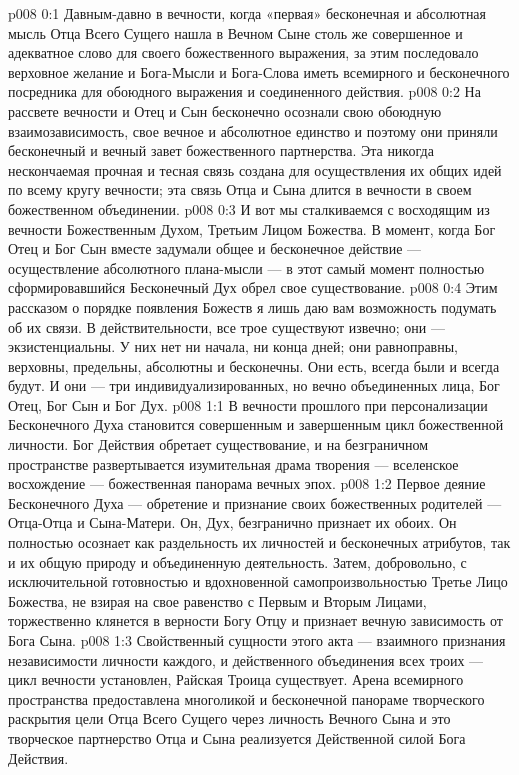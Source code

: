 \author{Божественный Советник}
\vs p008 0:1 Давным\hyp{}давно в вечности, когда «первая» бесконечная и абсолютная мысль Отца Всего Сущего нашла в Вечном Сыне столь же совершенное и адекватное слово для своего божественного выражения, за этим последовало верховное желание и Бога\hyp{}Мысли и Бога\hyp{}Слова иметь всемирного и бесконечного посредника для обоюдного выражения и соединенного действия.
\vs p008 0:2 На рассвете вечности и Отец и Сын бесконечно осознали свою обоюдную взаимозависимость, свое вечное и абсолютное единство и поэтому они приняли бесконечный и вечный завет божественного партнерства. Эта никогда нескончаемая прочная и тесная связь создана для осуществления их общих идей по всему кругу вечности; эта связь Отца и Сына длится в вечности в своем божественном объединении.
\vs p008 0:3 И вот мы сталкиваемся с восходящим из вечности Божественным Духом, Третьим Лицом Божества. В момент, когда Бог Отец и Бог Сын вместе задумали общее и бесконечное действие --- осуществление абсолютного плана\hyp{}мысли --- в этот самый момент полностью сформировавшийся Бесконечный Дух обрел свое существование.
\vs p008 0:4 \pc Этим рассказом о порядке появления Божеств я лишь даю вам возможность подумать об их связи. В действительности, все трое существуют извечно; они --- экзистенциальны. У них нет ни начала, ни конца дней; они равноправны, верховны, предельны, абсолютны и бесконечны. Они есть, всегда были и всегда будут. И они --- три индивидуализированных, но вечно объединенных лица, Бог Отец, Бог Сын и Бог Дух.
\vs p008 1:1 В вечности прошлого при персонализации Бесконечного Духа становится совершенным и завершенным цикл божественной личности. Бог Действия обретает существование, и на безграничном пространстве развертывается изумительная драма творения --- вселенское восхождение --- божественная панорама вечных эпох.
\vs p008 1:2 Первое деяние Бесконечного Духа --- обретение и признание своих божественных родителей --- Отца\hyp{}Отца и Сына\hyp{}Матери. Он, Дух, безгранично признает их обоих. Он полностью осознает как раздельность их личностей и бесконечных атрибутов, так и их общую природу и объединенную деятельность. Затем, добровольно, с исключительной готовностью и вдохновенной самопроизвольностью Третье Лицо Божества, не взирая на свое равенство с Первым и Вторым Лицами, торжественно клянется в верности Богу Отцу и признает вечную зависимость от Бога Сына.
\vs p008 1:3 Свойственный сущности этого акта --- взаимного признания независимости личности каждого, и действенного объединения всех троих --- цикл вечности установлен, Райская Троица существует. Арена всемирного пространства предоставлена многоликой и бесконечной панораме творческого раскрытия цели Отца Всего Сущего через личность Вечного Сына и это творческое партнерство Отца и Сына реализуется Действенной силой Бога Действия.
